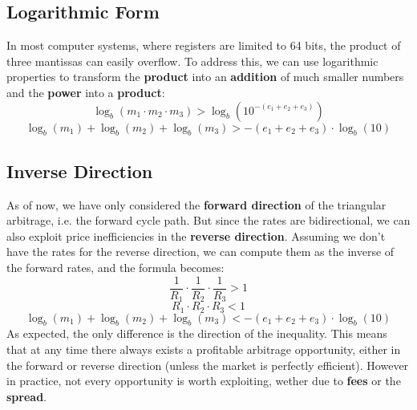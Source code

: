 \documentclass[11pt]{article}
\begin{document}
\subsection{Logarithmic Form}
In most computer systems, where registers are limited to 64 bits, the product of three mantissas can easily overflow. To address this, we can use logarithmic properties to transform the \textbf{product} into an \textbf{addition} of much smaller numbers and the \textbf{power} into a \textbf{product}:
\begin{equation}
    \log_b(m_1 \cdot m_2 \cdot m_3) > \log_b(10^{-(e_1 + e_2 + e_3)})
\end{equation}
\begin{equation}
    \log_b(m_1) + \log_b(m_2) + \log_b(m_3) > -(e_1 + e_2 + e_3) \cdot \log_b(10)
\end{equation}

\subsection{Inverse Direction}
As of now, we have only considered the \textbf{forward direction} of the triangular arbitrage, i.e. the forward cycle path. But since the rates are bidirectional, we can also exploit price inefficiencies in the \textbf{reverse direction}. Assuming we don't have the rates for the reverse direction, we can compute them as the inverse of the forward rates, and the formula becomes:
\setcounter{equation}{0}
\begin{equation}
    \frac{1}{R_{1}} \cdot \frac{1}{R_{2}} \cdot \frac{1}{R_{3}} > 1
\end{equation}
\begin{equation}
    {R_{1} \cdot R_{2} \cdot R_{3}} < 1
\end{equation}
\begin{equation}
    \log_b(m_1) + \log_b(m_2) + \log_b(m_3) < -(e_1 + e_2 + e_3) \cdot \log_b(10)
\end{equation}
As expected, the only difference is the direction of the inequality. This means that at any time there always exists a profitable arbitrage opportunity, either in the forward or reverse direction (unless the market is perfectly efficient). However in practice, not every opportunity is worth exploiting, wether due to \textbf{fees} or the \textbf{spread}\textsuperscript{\cite{spread}}.
\end{document}
